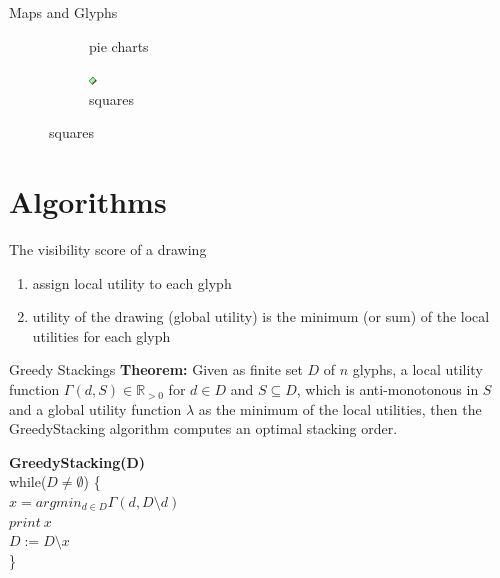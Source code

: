 \documentclass{beamer}
\newcommand\tab[1][1cm]{\hspace*{#1}}
\begin{document}
\begin{frame}{Maps and Glyphs}
\begin{figure}[!b]
\begin{subfigure}[b]{0.45\linewidth}
      \caption{pie charts}
    \end{subfigure}
    \begin{subfigure}[b]{0.45\linewidth}
      \centering
      \includegraphics[width=0.5\linewidth]{assets/symbol_square}
      \caption{squares}
    \end{subfigure}
  \end{figure}

\end{frame}

\section{Algorithms}

\begin{frame}{The visibility score of a drawing}
    \begin{enumerate}
        \item assign local utility to each glyph
        \item utility of the drawing (global utility) is the minimum (or sum) of the local utilities for each glyph
    \end{enumerate}
\end{frame}

\begin{frame}{Greedy Stackings}
    \textbf{Theorem:} Given as finite set $D$ of $n$ glyphs, a local utility function $\Gamma(d, S) \in \mathbb{R}_{>0}$ for $d\in D$ and $S\subseteq D$, which is anti-monotonous in $S$ and a global utility function $\lambda$ as the minimum of the local utilities, then the GreedyStacking algorithm computes an optimal stacking order.
    
    \pause
    
    \textbf{GreedyStacking(D)}\\
    while($D\neq \emptyset$) \{\\ 
        \tab$x=argmin_{d\in D} \Gamma(d, D\setminus d)$\\
        \tab$print\ x$\\
        \tab$D:=D\setminus x$\\
    \}
\end{frame}
\end{document}
